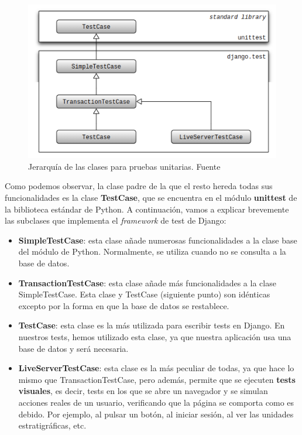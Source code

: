     \begin{figure}[H]
        \centering
        \includegraphics[scale=0.60]{imagenes/classes-hierarchy.png}
        \caption[Jerarquía de las clases para pruebas unitarias.]{Jerarquía de las
        clases para pruebas unitarias. Fuente \cite{classes-hierarchy}}
        \label{fig:classes-hierarchy}
    \end{figure}

Como podemos observar, la clase padre de la que el resto hereda todas sus funcionalidades
es la clase \textbf{TestCase}, que se encuentra en el módulo \textbf{unittest} de la
biblioteca estándar de Python. A continuación, vamos a explicar brevemente las subclases
que implementa el \textit{framework} de test de Django:

    \begin{itemize}
        \item \textbf{SimpleTestCase}: esta clase añade numerosas funcionalidades a la
        clase base del módulo de Python. Normalmente, se utiliza cuando no se consulta a
        la base de datos.
        \item \textbf{TransactionTestCase}: esta clase añade más funcionalidades a la
        clase SimpleTestCase. Esta clase y TestCase (siguiente punto) son idénticas
        excepto por la forma en que la base de datos se restablece.
        \item \textbf{TestCase}: esta clase es la más utilizada para escribir tests en
        Django. En nuestros tests, hemos utilizado esta clase, ya que nuestra aplicación
        usa una base de datos y será necesaria.
        \item \textbf{LiveServerTestCase}: esta clase es la más peculiar de todas, ya que
        hace lo mismo que TransactionTestCase, pero además, permite que se ejecuten
        \textbf{tests visuales}, es decir, tests en los que se abre un navegador y se
        simulan acciones reales de un usuario, verificando que la página se comporta
        como es debido. Por ejemplo, al pulsar un botón, al iniciar sesión, al ver las
        unidades estratigráficas, etc.
    \end{itemize}

